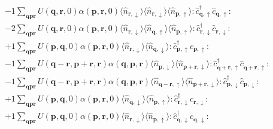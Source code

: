 \begin{align*}
	&-1 \sum_{ \mathbf{q} \mathbf{p} \mathbf{r} } U( \mathbf{q}, \mathbf{r}, 0 )  \alpha( \mathbf{p}, \mathbf{r}, 0 )   \langle \hat{n}_{ \mathbf{r}, \downarrow } \rangle \langle \hat{n}_{ \mathbf{r}, \downarrow } \rangle \langle \hat{n}_{ \mathbf{p}, \uparrow } \rangle :\hat{c}_{ \mathbf{q}, \uparrow }^\dagger \hat{c}_{ \mathbf{q}, \uparrow }^{\phantom{\dagger}}: \\
	&-2 \sum_{ \mathbf{q} \mathbf{p} \mathbf{r} } U( \mathbf{q}, \mathbf{r}, 0 )  \alpha( \mathbf{p}, \mathbf{r}, 0 )   \langle \hat{n}_{ \mathbf{r}, \downarrow } \rangle \langle \hat{n}_{ \mathbf{q}, \uparrow } \rangle \langle \hat{n}_{ \mathbf{p}, \uparrow } \rangle :\hat{c}_{ \mathbf{r}, \downarrow }^\dagger \hat{c}_{ \mathbf{r}, \downarrow }^{\phantom{\dagger}}: \\
	&+1 \sum_{ \mathbf{q} \mathbf{p} \mathbf{r} } U( \mathbf{p}, \mathbf{q}, 0 )  \alpha( \mathbf{p}, \mathbf{r}, 0 )   \langle \hat{n}_{ \mathbf{r}, \downarrow } \rangle \langle \hat{n}_{ \mathbf{q}, \downarrow } \rangle :\hat{c}_{ \mathbf{p}, \uparrow }^\dagger \hat{c}_{ \mathbf{p}, \uparrow }^{\phantom{\dagger}}: \\
	&-1 \sum_{ \mathbf{q} \mathbf{p} \mathbf{r} } U( \mathbf{q}-\mathbf{r}, \mathbf{p}+\mathbf{r}, \mathbf{r} )  \alpha( \mathbf{q}, \mathbf{p}, \mathbf{r} )   \langle \hat{n}_{ \mathbf{p}, \downarrow } \rangle \langle \hat{n}_{ \mathbf{p}+\mathbf{r}, \downarrow } \rangle :\hat{c}_{ \mathbf{q}+\mathbf{r}, \uparrow }^\dagger \hat{c}_{ \mathbf{q}+\mathbf{r}, \uparrow }^{\phantom{\dagger}}: \\
	&-1 \sum_{ \mathbf{q} \mathbf{p} \mathbf{r} } U( \mathbf{q}-\mathbf{r}, \mathbf{p}+\mathbf{r}, \mathbf{r} )  \alpha( \mathbf{q}, \mathbf{p}, \mathbf{r} )   \langle \hat{n}_{ \mathbf{q}-\mathbf{r}, \uparrow } \rangle \langle \hat{n}_{ \mathbf{p}+\mathbf{r}, \downarrow } \rangle :\hat{c}_{ \mathbf{p}, \downarrow }^\dagger \hat{c}_{ \mathbf{p}, \downarrow }^{\phantom{\dagger}}: \\
	&+1 \sum_{ \mathbf{q} \mathbf{p} \mathbf{r} } U( \mathbf{p}, \mathbf{q}, 0 )  \alpha( \mathbf{p}, \mathbf{r}, 0 )   \langle \hat{n}_{ \mathbf{q}, \downarrow } \rangle \langle \hat{n}_{ \mathbf{p}, \uparrow } \rangle :\hat{c}_{ \mathbf{r}, \downarrow }^\dagger \hat{c}_{ \mathbf{r}, \downarrow }^{\phantom{\dagger}}: \\
	&+1 \sum_{ \mathbf{q} \mathbf{p} \mathbf{r} } U( \mathbf{p}, \mathbf{q}, 0 )  \alpha( \mathbf{p}, \mathbf{r}, 0 )   \langle \hat{n}_{ \mathbf{r}, \downarrow } \rangle \langle \hat{n}_{ \mathbf{p}, \uparrow } \rangle :\hat{c}_{ \mathbf{q}, \downarrow }^\dagger \hat{c}_{ \mathbf{q}, \downarrow }^{\phantom{\dagger}}: \\

\end{align*}
